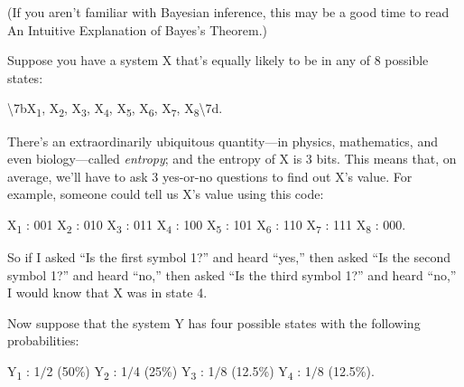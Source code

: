 \myendsectiontext


{
 (If you aren't familiar with Bayesian inference,
this may be a good time to read An Intuitive Explanation of
Bayes's Theorem.) }

{
 Suppose you have a system X that's equally likely
to be in any of 8 possible states:}

{\centering
 {\textbackslash}{\textquotesingle}7bX\textsubscript{1},
X\textsubscript{2}, X\textsubscript{3}, X\textsubscript{4},
X\textsubscript{5}, X\textsubscript{6}, X\textsubscript{7},
X\textsubscript{8}{\textbackslash}{\textquotesingle}7d.
\par}


\bigskip

{
 There's an extraordinarily ubiquitous
quantity---in physics, mathematics, and even biology---called
\textit{entropy}; and the entropy of X is 3 bits. This means that, on
average, we'll have to ask 3 yes-or-no questions to
find out X's value. For example, someone could tell us
X's value using this code:}

{\centering
 X\textsubscript{1} : 001\newline
 X\textsubscript{2} : 010\newline
 X\textsubscript{3} : 011\newline
 X\textsubscript{4} : 100\newline
 X\textsubscript{5} : 101\newline
 X\textsubscript{6} : 110\newline
 X\textsubscript{7} : 111\newline
 X\textsubscript{8} : 000.
\par}


\bigskip

{
 So if I asked ``Is the first symbol
1?'' and heard
``yes,'' then asked
``Is the second symbol 1?'' and
heard ``no,'' then asked
``Is the third symbol 1?'' and heard
``no,'' I would know that X was in
state 4.}

{
 Now suppose that the system Y has four possible states with the
following probabilities:}

{\centering
 Y\textsubscript{1} : 1$/$2 (50\%)\newline
 Y\textsubscript{2} : 1$/$4 (25\%)\newline
 Y\textsubscript{3} : 1$/$8 (12.5\%)\newline
 Y\textsubscript{4} : 1$/$8 (12.5\%).
\par}


